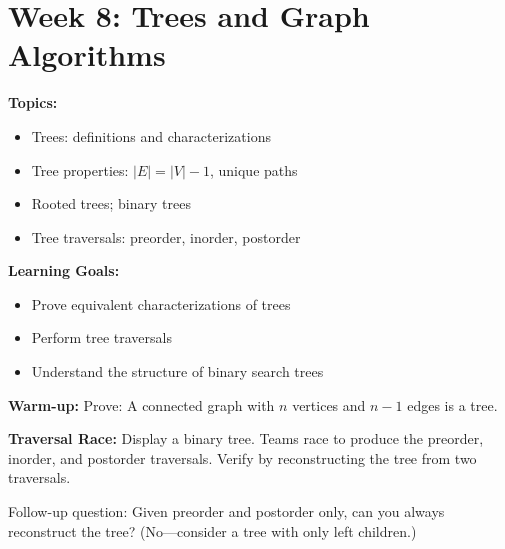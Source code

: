\documentclass[11pt]{article}
\begin{document}
\newpage
\section{Week 8: Trees and Graph Algorithms}

\begin{classabox}
\textbf{Topics:}
\begin{itemize}
    \item Trees: definitions and characterizations
    \item Tree properties: $|E| = |V| - 1$, unique paths
    \item Rooted trees; binary trees
    \item Tree traversals: preorder, inorder, postorder
\end{itemize}

\textbf{Learning Goals:}
\begin{itemize}
    \item Prove equivalent characterizations of trees
    \item Perform tree traversals
    \item Understand the structure of binary search trees
\end{itemize}

\textbf{Warm-up:} Prove: A connected graph with $n$ vertices and $n-1$ edges is a tree.
\end{classabox}

\begin{activitybox}
\textbf{Traversal Race:} Display a binary tree. Teams race to produce the preorder, inorder, and postorder traversals. Verify by reconstructing the tree from two traversals.

Follow-up question: Given preorder and postorder only, can you always reconstruct the tree? (No---consider a tree with only left children.)
\end{activitybox}
\end{document}
